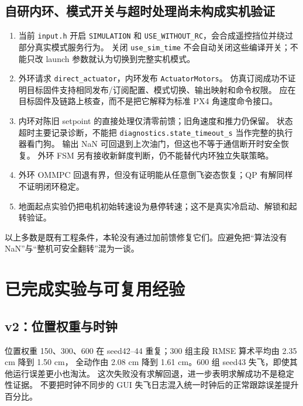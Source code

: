 \documentclass[UTF8,a4paper,11pt,fontset=fandol]{ctexart}
\newcommand{\code}[1]{{\small\nolinkurl{#1}}}
\begin{document}
\subsection{自研内环、模式开关与超时处理尚未构成实机验证}
\begin{enumerate}
\item 当前 \code{input.h} 开启 \code{SIMULATION} 和 \code{USE_WITHOUT_RC}，会合成遥控挡位并绕过部分真实模式服务行为。
关闭 \code{use_sim_time} 不会自动关闭这些编译开关；不能只改 launch 参数就认为切换到完整实机模式。
\item 外环请求 \code{direct_actuator}，内环发布 \code{ActuatorMotors}。
仿真订阅成功不证明目标固件支持相同发布/订阅配置、模式切换、输出映射和命令权限。
应在目标固件及链路上核查，而不是把它解释为标准 PX4 角速度命令接口。
\item 内环对陈旧 setpoint 的直接处理仅清零前馈；旧角速度和推力仍保留。
状态超时主要记录诊断，不能把 \code{diagnostics.state_timeout_s} 当作完整的执行器看门狗。
输出 NaN 可回退到上次油门，但这也不等于通信断开时安全恢复。
外环 FSM 另有接收新鲜度判断，仍不能替代内环独立失联策略。
\item 外环 OMMPC 回退有界，但没有证明能从任意倒飞姿态恢复；QP 有解同样不证明闭环稳定。
\item 地面起点实验仍把电机初始转速设为悬停转速；这不是真实冷启动、解锁和起转验证。
\end{enumerate}
以上多数是既有工程条件，本轮没有通过加前馈修复它们。应避免把“算法没有 NaN”与“整机可安全翻转”混为一谈。

\section{已完成实验与可复用经验}
\subsection{v2：位置权重与时钟}
位置权重 150、300、600 在 seed42--44 重复；300 组主段 RMSE 算术平均由 2.35 cm 降到 1.50 cm，
全动作由 2.08 cm 降到 1.61 cm。600 组 seed43 失飞，即使其他运行误差更小也淘汰。
这次失败没有求解回退，进一步表明求解成功不是稳定性证据。
不要把时钟不同步的 GUI 失飞日志混入统一时钟后的正常跟踪误差提升百分比。
\end{document}
